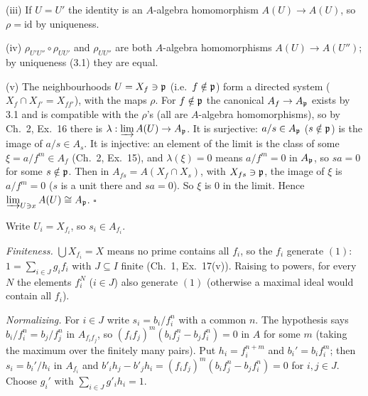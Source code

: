 \documentclass[11pt]{article}
\begin{document}
(iii) If $U=U'$ the identity is an $A$-algebra homomorphism $A(U)\to A(U)$, so $\rho=\mathrm{id}$ by uniqueness.

(iv) $\rho_{U'U''}\circ\rho_{UU'}$ and $\rho_{UU''}$ are both $A$-algebra homomorphisms $A(U)\to A(U'')$; by uniqueness (3.1) they are equal.

(v) The neighbourhoods $U=X_f\ni\mathfrak p$ (i.e.\ $f\notin\mathfrak p$) form a directed system ($X_f\cap X_{f'}=X_{ff'}$), with the maps $\rho$. For $f\notin\mathfrak p$ the canonical $A_f\to A_\mathfrak p$ exists by 3.1 and is compatible with the $\rho$'s (all are $A$-algebra homomorphisms), so by Ch.~2, Ex.~16 there is $\lambda:\varinjlim A(U)\to A_\mathfrak p$. It is surjective: $a/s\in A_\mathfrak p$ ($s\notin\mathfrak p$) is the image of $a/s\in A_s$. It is injective: an element of the limit is the class of some $\xi=a/f^m\in A_f$ (Ch.~2, Ex.~15), and $\lambda(\xi)=0$ means $a/f^m=0$ in $A_\mathfrak p$, so $sa=0$ for some $s\notin\mathfrak p$. Then in $A_{fs}=A(X_f\cap X_s)$, with $X_{fs}\ni\mathfrak p$, the image of $\xi$ is $a/f^m=0$ ($s$ is a unit there and $sa=0$). So $\xi$ is $0$ in the limit. Hence $\varinjlim_{U\ni x}A(U)\cong A_\mathfrak p$. \hfill$\square$

\pf
Write $U_i=X_{f_i}$, so $s_i\in A_{f_i}$.

\emph{Finiteness.} $\bigcup X_{f_i}=X$ means no prime contains all $f_i$, so the $f_i$ generate $(1)$: $1=\sum_{i\in J}g_if_i$ with $J\subseteq I$ finite (Ch.~1, Ex.~17(v)). Raising to powers, for every $N$ the elements $f_i^N$ ($i\in J$) also generate $(1)$ (otherwise a maximal ideal would contain all $f_i$).

\emph{Normalizing.} For $i\in J$ write $s_i=b_i/f_i^{n}$ with a common $n$. The hypothesis says $b_i/f_i^n=b_j/f_j^n$ in $A_{f_if_j}$, so $(f_if_j)^m(b_if_j^n-b_jf_i^n)=0$ in $A$ for some $m$ (taking the maximum over the finitely many pairs). Put $h_i=f_i^{n+m}$ and $b_i'=b_if_i^m$; then $s_i=b_i'/h_i$ in $A_{f_i}$ and $b'_ih_j-b'_jh_i=(f_if_j)^m(b_if_j^n-b_jf_i^n)=0$ for $i,j\in J$. Choose $g_i'$ with $\sum_{i\in J}g'_ih_i=1$.
\end{document}

